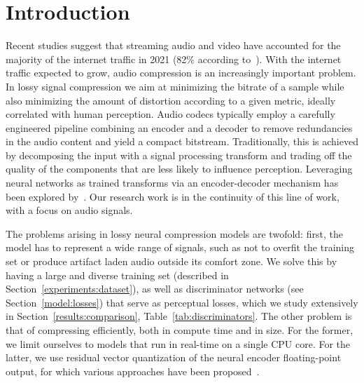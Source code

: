\section{Introduction}

Recent studies suggest that streaming audio and video have accounted for the majority of the internet traffic in 2021 (82\% according to~\citep{internet_traffic_cisco}).
With the internet traffic expected to grow, audio compression is an increasingly important problem. 
In lossy signal compression we aim at minimizing the bitrate of a sample while also minimizing the amount of distortion according to a given metric, ideally correlated with human perception.
Audio codecs typically employ a carefully engineered pipeline combining an encoder and a decoder 
to remove redundancies in the audio content and yield a compact bitstream. 
Traditionally, this is achieved by decomposing the input with a signal processing transform and trading off the quality of the components that are less likely to influence perception.
Leveraging neural networks as trained transforms via an encoder-decoder mechanism has been explored by~\citet{morishima1990speech,rippel2019learned,zeghidour2021soundstream}. Our research work is in the continuity of this line of work, with a focus on audio signals.

The problems arising in lossy neural compression models are twofold: first, the model has to represent a wide range of signals, such as not to overfit the training set or produce artifact laden audio outside its comfort zone. 
We solve this by having a large and diverse training set (described in Section~\ref{experiments:dataset}), as well as discriminator networks (see Section~\ref{model:losses}) that serve as perceptual losses, which we study extensively in Section~\ref{results:comparison}, Table~\ref{tab:discriminators}.
The other problem is that of compressing efficiently, both in compute time and in size. For the former, we limit ourselves to models that run in real-time on a single CPU core. For the latter, we use residual vector quantization of the neural encoder floating-point output, for which various approaches have been proposed~\citep{van2017neural,zeghidour2021soundstream}.

